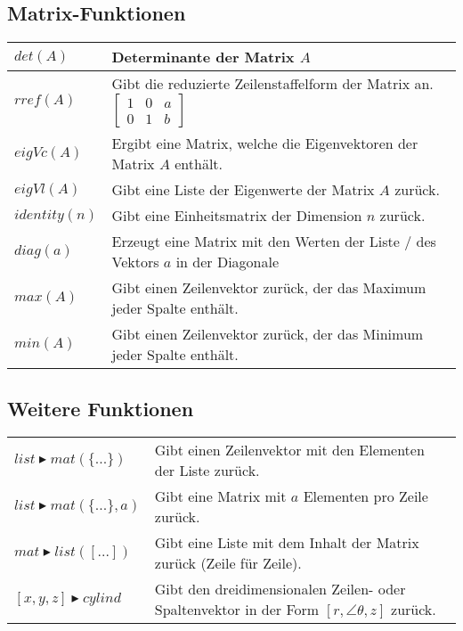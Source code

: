 \subsection{Matrix-Funktionen}
\begin{tabular}{|l|l|}
	\hline
	$det(A)$						& Determinante der Matrix $A$ \\ \hline
	$rref(A)$						& Gibt die reduzierte Zeilenstaffelform der Matrix an. $\begin{bmatrix}1&0&a \\ 0&1&b\end{bmatrix}$ \\ \hline
	$eigVc(A)$						& Ergibt eine Matrix, welche die Eigenvektoren der Matrix $A$ enthält. \\ \hline
	$eigVl(A)$						& Gibt eine Liste der Eigenwerte der Matrix $A$ zurück. \\ \hline
	$identity(n)$					& Gibt eine Einheitsmatrix der Dimension $n$ zurück. \\ \hline
	$diag(a)$						& Erzeugt eine Matrix mit den Werten der Liste / des Vektors $a$ in der Diagonale \\ \hline
	$max(A)$						& Gibt einen Zeilenvektor zurück, der das Maximum jeder Spalte enthält. \\ \hline
	$min(A)$						& Gibt einen Zeilenvektor zurück, der das Minimum jeder Spalte enthält. \\ \hline
\end{tabular}

\subsection{Weitere Funktionen}
\begin{tabular}{|l|l|}
	\hline
	$list \blacktriangleright mat(\{...\})$			& Gibt einen Zeilenvektor mit den Elementen der Liste zurück. \\
	$list \blacktriangleright mat(\{...\},a)$		& Gibt eine Matrix mit $a$ Elementen pro Zeile zurück.\\ \hline
	$mat \blacktriangleright list([...])$			& Gibt eine Liste mit dem Inhalt der Matrix zurück (Zeile für Zeile). \\ \hline
	$[x,y,z] \blacktriangleright cylind$			& Gibt den dreidimensionalen Zeilen- oder Spaltenvektor in der Form $[r, \angle \theta , z ]$ zurück. \\ \hline
\end{tabular}